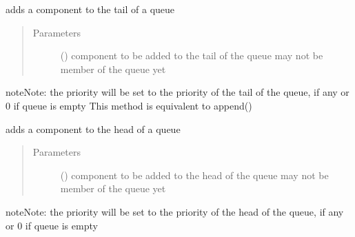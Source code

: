 \documentclass[letterpaper,10pt,english]{sphinxmanual}
\begin{document}
\begin{fulllineitems}
\begin{fulllineitems}
\label{\detokenize{Reference:salabim.Queue.add}}
adds a component to the tail of a queue
\begin{quote}\begin{description}
\item[{Parameters}] \leavevmode
{} ({\hyperref[\detokenize{Reference:salabim.Component}]{}}) \textendash{} component to be added to the tail of the queue 
may not be member of the queue yet

\end{description}\end{quote}

\begin{sphinxadmonition}{note}{Note:}
the priority will be set to
the priority of the tail of the queue, if any
or 0 if queue is empty 
This method is equivalent to append()
\end{sphinxadmonition}

\end{fulllineitems}


\begin{fulllineitems}
\label{\detokenize{Reference:salabim.Queue.add_at_head}}
adds a component to the head of a queue
\begin{quote}\begin{description}
\item[{Parameters}] \leavevmode
{} ({\hyperref[\detokenize{Reference:salabim.Component}]{}}) \textendash{} component to be added to the head of the queue 
may not be member of the queue yet

\end{description}\end{quote}

\begin{sphinxadmonition}{note}{Note:}
the priority will be set to
the priority of the head of the queue, if any
or 0 if queue is empty
\end{sphinxadmonition}

\end{fulllineitems}


\end{fulllineitems}
\end{document}
